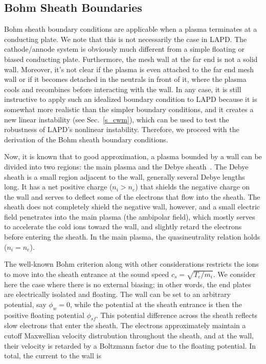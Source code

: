 \subsection{Bohm Sheath Boundaries}
\label{ss_bs_bc}

Bohm sheath boundary conditions are applicable when a plasma terminates at a conducting plate. We note that this is not necessarily the case in LAPD. 
The cathode/annode system is obviously much different from a simple floating or biased conducting plate. Furthermore, the mesh wall at the far end is not a solid wall.
Moreover, it's not clear if the plasma is even attached to the far end mesh wall or if it becomes detached in the neutrals in front of it, where the plasma cools and recombines
before interacting with the wall. In any case, it is still instructive to apply such an idealized boundary condition to LAPD because it is somewhat more realistic
than the simpler boundary conditions, and it creates a new linear instability (see Sec.~\ref{s_cwm}), which can be used to test the robustness of LAPD's nonlinear instability.
Therefore, we proceed with the derivation of the Bohm sheath boundary conditions.

Now, it is known that to good approximation, a plasma bounded by a wall can be divided into two regions: the main plasma and the Debye sheath~\cite{stangeby2000}. 
The Debye sheath is a small region adjacent to the wall, generally several Debye lengths long. It has a net positive charge ($n_i > n_e$) 
that shields the negative charge on the wall and serves
to deflect some of the electrons that flow into the sheath. The sheath does not completely shield the negative wall, however, and a small electric field penetrates into
the main plasma (the ambipolar field), which mostly serves to accelerate the cold ions toward the wall, and slightly retard the electrons before entering the sheath.
In the main plasma, the quasineutrality relation holds ($n_i = n_e$). 

The well-known Bohm criterion along with other considerations restricts the ions to move into the sheath entrance at the sound speed $c_s = \sqrt{T_e/m_i}$. 
We consider here the case where there is no external biasing; in other words, the end plates are electrically isolated and floating.
The wall can be set to an arbitrary potential, say $\phi_w = 0$, while the potential at the sheath entrance is then the positive 
floating potential $\phi_{sf}$. This potential difference across the sheath reflects slow electrons that enter the sheath.
The electrons approximately maintain a cutoff Maxwellian velocity distrubution throughout the sheath, and at the wall, 
their velocity is retarded by a Boltzmann factor due to the floating potential. 
In total, the current to the wall is~\cite{berk1991,berk1993,xu1993}

